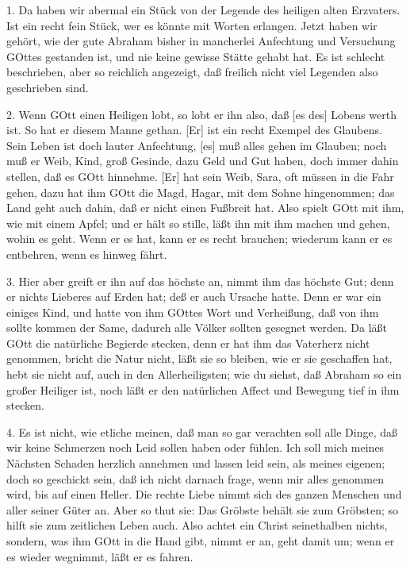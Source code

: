 1. Da haben wir abermal ein Stück von der Legende des heiligen alten Erzvaters. Ist ein recht fein Stück, wer es könnte mit Worten erlangen. Jetzt haben wir gehört, wie der gute Abraham bisher in mancherlei Anfechtung und Versuchung GOttes gestanden ist, und nie keine gewisse Stätte gehabt hat. Es ist schlecht beschrieben, aber so reichlich angezeigt, daß freilich nicht viel Legenden also geschrieben sind.

2. Wenn GOtt einen Heiligen lobt, so lobt er ihn also, daß [es des] Lobens werth ist. So hat er diesem Manne gethan. [Er] ist ein recht Exempel des Glaubens. Sein Leben ist doch lauter Anfechtung, [es] muß alles gehen im Glauben; noch muß er Weib, Kind, groß Gesinde, dazu Geld und Gut haben, doch immer dahin stellen, daß es GOtt hinnehme. [Er] hat sein Weib, Sara, oft müssen in die Fahr gehen, dazu hat ihm GOtt die Magd, Hagar, mit dem Sohne hingenommen; das Land geht auch dahin, daß er nicht einen Fußbreit hat. Also spielt GOtt mit ihm, wie mit einem Apfel; und er hält so stille, läßt ihn mit ihm machen und gehen, wohin es geht. Wenn er es hat, kann er es recht brauchen; wiederum kann er es entbehren, wenn es hinweg fährt.

3. Hier aber greift er ihn auf das höchste an, nimmt ihm das höchste Gut; denn er nichts Lieberes auf Erden hat; deß er auch Ursache hatte. Denn er war ein einiges Kind, und hatte von ihm GOttes Wort und Verheißung, daß von ihm sollte kommen der Same, dadurch alle Völker sollten gesegnet werden. Da läßt GOtt die natürliche Begierde stecken, denn er hat ihm das Vaterherz nicht genommen, bricht die Natur
nicht, läßt sie so bleiben, wie er sie geschaffen hat, hebt sie nicht auf, auch in den Allerheiligsten; wie du siehst, daß Abraham so ein großer Heiliger ist, noch läßt er den natürlichen Affect und Bewegung tief in ihm stecken.

4. Es ist nicht, wie etliche meinen, daß man so gar verachten soll alle Dinge, daß wir keine Schmerzen noch Leid sollen haben oder fühlen. Ich soll mich meines Nächsten Schaden herzlich annehmen und lassen leid sein, als meines eigenen; doch so geschickt sein, daß ich nicht darnach frage, wenn mir alles genommen wird, bis auf einen Heller. Die rechte Liebe nimmt sich des ganzen Menschen und aller seiner Güter an. Aber so thut sie: Das Gröbste behält sie zum Gröbsten; so hilft sie zum zeitlichen Leben auch. Also achtet ein Christ seinethalben nichts, sondern, was ihm GOtt in die Hand gibt, nimmt er an, geht damit um; wenn er es wieder wegnimmt, läßt er es fahren.

